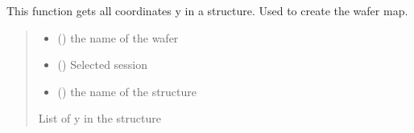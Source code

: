 \documentclass[letterpaper,10pt,english]{sphinxmanual}
\begin{document}

\begin{fulllineitems}
\label{\detokenize{VBD:VBD.get_all_y}}
\pysigstartsignatures
{}
\pysigstopsignatures
\sphinxAtStartPar
This function gets all coordinates y in a structure. Used to create the wafer map.
\begin{quote}\begin{description}
\begin{itemize}
\item {} 
\sphinxAtStartPar
{} () \textendash{} the name of the wafer

\item {} 
\sphinxAtStartPar
{} () \textendash{} Selected session

\item {} 
\sphinxAtStartPar
{} () \textendash{} the name of the structure

\end{itemize}

\sphinxAtStartPar
List of y in the structure

\end{description}\end{quote}

\end{fulllineitems}

\end{document}

